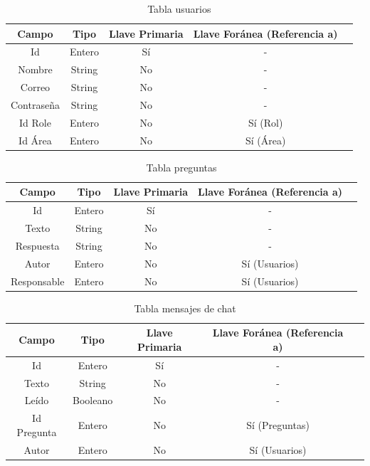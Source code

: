 \begin{table}[h]
	\begin{tabular}{| c | c | c | c | c |}
		\hline
		Campo & Tipo & Llave Primaria & Llave Foránea (Referencia a) \\ \hline
		Id & Entero & Sí & -  \\ \hline 
		Nombre & String & No & - \\ \hline
		Correo & String & No & - \\ \hline
		Contraseña & String & No & - \\ \hline
		Id Role & Entero & No & Sí (Rol) \\ \hline
		Id Área & Entero & No & Sí (Área) \\ \hline
	\end{tabular}
	\caption{Tabla usuarios}
	\label{table:users}
\end{table}

\begin{table}[h]
	\begin{tabular}{| c | c | c | c | c |}
		\hline
		Campo & Tipo & Llave Primaria & Llave Foránea (Referencia a) \\ \hline
		Id & Entero & Sí & -  \\ \hline 
		Texto & String & No & - \\ \hline
		Respuesta & String & No & - \\ \hline
		Autor & Entero & No & Sí (Usuarios) \\ \hline
		Responsable & Entero & No & Sí (Usuarios) \\ \hline
	\end{tabular}
	\caption{Tabla preguntas}
	\label{table:questions}
\end{table}

\begin{table}[h]
	\begin{tabular}{| c | c | c | c | c |}
		\hline
		Campo & Tipo & Llave Primaria & Llave Foránea (Referencia a) \\ \hline
		Id & Entero & Sí & -  \\ \hline 
		Texto & String & No & - \\ \hline
		Leído & Booleano & No & - \\ \hline
		Id Pregunta & Entero & No & Sí (Preguntas) \\ \hline
		Autor & Entero & No & Sí (Usuarios) \\ \hline
	\end{tabular}
	\caption{Tabla mensajes de chat}
	\label{table:chat}
\end{table}


